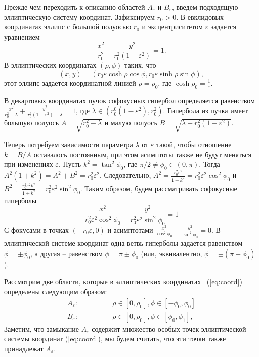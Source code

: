 Прежде чем переходить к описанию областей $A_\varepsilon$ и  $B_\varepsilon$, введем подходящую эллиптическую систему координат.
Зафиксируем $r_0>0$. 
В евклидовых координатах эллипс с большой полуосью  $r_0$ и эксцентриситетом  $\varepsilon$ 
задается уравнением
$$
\frac{x^2}{r_0^2} + \frac{y^2}{r_0^2(1-\varepsilon^2)}=1.
$$
В эллиптических координатах
$(\rho,\phi)$ таких, что
\begin{equation}
\label{eq:coord}
(x, y) = (r_0\varepsilon \cosh \rho \cos \phi , r_0\varepsilon \sinh \rho \sin \phi),
\end{equation}
этот эллипс задается координатной линией $\rho=\rho_0$,
где $\cosh \rho_0 = \frac{1}{\varepsilon}$.

В декартовых координатах пучок софокусных гипербол определяется равенством
$\frac{x^2}{r_0^2 - \lambda} + \frac{y^2}{r_0^2(1-\varepsilon^2) - \lambda} = 1$, где $\lambda\in (r_0^0 (1-\varepsilon^2),r_0^2)$.
Гипербола из пучка имеет большую полуось
 $A=\sqrt{r_0^2 - \lambda}$
и малую полуось $ B=\sqrt{\lambda - r_0^2(1-\varepsilon^2)}$.
 
Теперь потребуем зависимости параметра $\lambda $ от  $\varepsilon$ такой, чтобы отношение $k=B/A$ оставалось постоянным, при этом асимптоты также не будут меняться при изменениях $\varepsilon$. Пусть $k^2 = \tan ^2 \phi_0$, где $\pi/2\ne \phi_0\in (0,\pi) $.
 Тогда $A^2(1+k^2) = A^2+B^2 = r_0^2\varepsilon^2.$
 Следовательно, $A^2=\frac{r_0^2\varepsilon^2}{1+k^2} = r_0^2\varepsilon^2\cos^2\phi_0$ и
 $B^2=\frac{r_0^2\varepsilon^2k^2}{1+k^2} = r_0^2\varepsilon^2\sin^2\phi_0$.
 Таким образом, будем рассматривать софокусные гиперболы
 \begin{equation}\label{eq:hyper}
 \frac{x^2}{r_0^2\varepsilon^2\cos^2\phi_0}  -  \frac{y^2}{r_0^2\varepsilon^2\sin^2\phi_0}  =1
 \end{equation}
С фокусами в точках $(\pm r_0\varepsilon,0)$ и асимптотами
 $
  \frac{x^2}{\cos^2\phi_0}  -  \frac{y^2}{\sin^2\phi_0}  =0.
 $
В эллиптической системе координат одна ветвь гиперболы задается равенством $\phi = \pm\phi_0$, а другая -- равенством $\phi =\pi\pm\phi_0$ (или, эквивалентно, $\phi =\pm(\pi-\phi_0)$).
 
Рассмотрим две области, которые в эллиптических координатах ~(\ref{eq:coord})
определены следующим образом:
$$
\begin{aligned}
 A_\varepsilon:&\qquad\qquad \rho \in [0, \rho_0], \phi \in [-\phi_0, \phi_0 ]\\
  B_\varepsilon:&\qquad\qquad  \rho \in [0, \rho_0], \phi \in [\phi_0, \phi_1 ], 
\end{aligned}
$$
Заметим, что замыкание  $A_\varepsilon$ содержит множество особых точек эллиптической системы координат (\ref{eq:coord}), мы будем считать, что эти точки также принадлежат $A_\varepsilon$.

